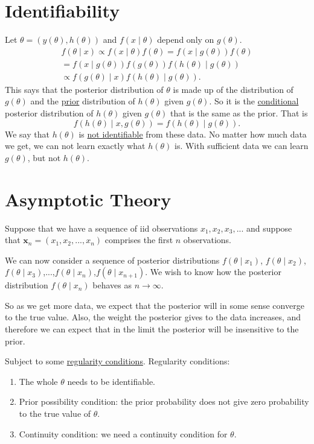 \documentclass[lecture,12pt,]{pcms-l}
\numberwithin{section}{chapter}
\numberwithin{equation}{chapter}
\theoremstyle{plain}
\theoremstyle{definition}
\theoremstyle{definition}
\begin{document}
\section{Identifiability}
Let $\theta = (y(\theta),h(\theta))$ and $f(x \mid \theta)$ depend only on $g(\theta)$.
\begin{equation}
\begin{split}
f(\theta \mid x) \propto f(x \mid \theta)f(\theta)= f(x \mid g(\theta))f(\theta)
\\
=f(x \mid g(\theta))f(g(\theta))f(h(\theta) \mid g(\theta))
\\
\propto f(g(\theta) \mid x) f(h(\theta) \mid g(\theta)).
\end{split}
\end{equation}
This says that the posterior distribution of $\theta$ is made up of the distribution of $g(\theta)$ and the \underline{prior} distribution of $h(\theta)$ given $g(\theta)$. So it is the \underline{conditional} posterior distribution of $h(\theta)$ given $g(\theta)$ that is the same as the prior. That is 
\begin{equation}
f(h(\theta)\mid x, g(\theta))=f(h(\theta)\mid g(\theta)).
\end{equation}
We say that $h(\theta)$ is \underline{not identifiable} from these data. No matter how much data we get, we can not learn exactly what $h(\theta)$ is. With sufficient data we can learn $g(\theta)$, but not $h(\theta)$.

\section{Asymptotic Theory}

Suppose that we have a sequence of iid observations $x_1,x_2,x_3,...$ and suppose that $\mathbf{x}_n=(x_1,x_2,...,x_n)$ comprises the first $n$ observations. 

We can now consider a sequence of posterior distributions $f(\theta \mid x_1)$, $f(\theta \mid x_2)$, $f(\theta \mid x_3)$,...,$f(\theta \mid x_n)$,$f(\theta \mid x_{n+1})$. We wish to know how the posterior distribution $f(\theta \mid x_n)$ behaves as $n \rightarrow \infty$.

So as we get more data, we expect that the posterior will in some sense converge to the true value. Also, the weight the posterior gives to the data increases, and therefore we can expect that in the limit the posterior will be insensitive to the prior.

Subject to some \underline{regularity conditions}. Regularity conditions:
\begin{enumerate}
\item The whole $\theta$ needs to be identifiable.
\item Prior possibility condition: the prior probability does not give zero probability to the true value of $\theta$.
\item Continuity condition: we need a continuity condition for $\theta$. 
\end{enumerate}
\end{document}
